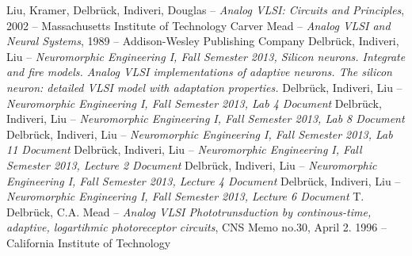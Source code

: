 \documentclass[report]{subfiles}
\begin{document}
\begin{thebibliography}{7}
Liu, Kramer, Delbrück, Indiveri, Douglas -- \emph{Analog VLSI: Circuits and Principles}, 2002 -- Massachusetts Institute of Technology
Carver Mead -- \emph{Analog VLSI and Neural Systems}, 1989 -- Addison-Wesley Publishing Company
Delbrück, Indiveri, Liu -- \emph{Neuromorphic Engineering I, Fall Semester 2013, Silicon neurons. Integrate and fire models. Analog VLSI implementations of adaptive neurons. The silicon neuron: detailed VLSI model with adaptation properties. }
Delbrück, Indiveri, Liu -- \emph{Neuromorphic Engineering I, Fall Semester 2013, Lab 4 Document}
Delbrück, Indiveri, Liu -- \emph{Neuromorphic Engineering I, Fall Semester 2013, Lab 8 Document}
Delbrück, Indiveri, Liu -- \emph{Neuromorphic Engineering I, Fall Semester 2013, Lab 11 Document}
Delbrück, Indiveri, Liu -- \emph{Neuromorphic Engineering I, Fall Semester 2013, Lecture 2 Document}
Delbrück, Indiveri, Liu -- \emph{Neuromorphic Engineering I, Fall Semester 2013, Lecture 4 Document}
Delbrück, Indiveri, Liu -- \emph{Neuromorphic Engineering I, Fall Semester 2013, Lecture 6 Document}
T. Delbrück, C.A. Mead -- \emph{Analog VLSI Phototrunsduction by continous-time, adaptive, logartihmic photoreceptor circuits}, CNS Memo no.30, April 2. 1996 -- California Institute of Technology
\end{thebibliography}
\end{document}
